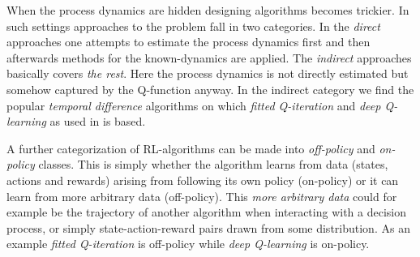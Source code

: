 When the process dynamics are hidden designing algorithms becomes trickier.
In such settings approaches to the problem
fall in two categories. In the \emph{direct} approaches
one attempts to estimate the process dynamics first and then afterwards
methods for the known-dynamics are applied.
The \emph{indirect} approaches basically covers \emph{the rest}.
Here the process dynamics is not directly estimated but
somehow captured by the Q-function anyway.
In the indirect category we find the popular \emph{temporal difference}
algorithms on which \emph{fitted Q-iteration}
and \emph{deep Q-learning} as used in  is based.

A further categorization of RL-algorithms can be made into
\emph{off-policy} and \emph{on-policy} classes.
This is simply whether the algorithm learns from data
(states, actions and rewards) arising from 
following its own policy (on-policy) or it can learn from more
arbitrary data (off-policy).
This \emph{more arbitrary data} could for example be
the trajectory of another algorithm when interacting with a decision process,
or simply state-action-reward pairs drawn from some distribution.
As an example \emph{fitted Q-iteration} is off-policy while
\emph{deep Q-learning} is on-policy.


